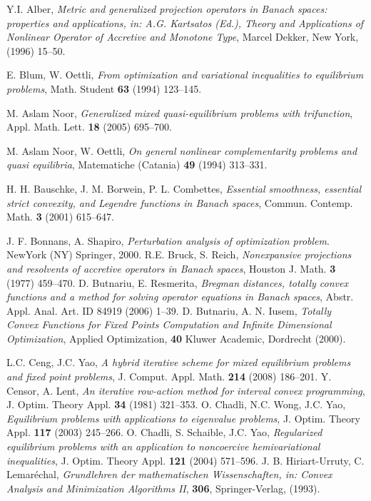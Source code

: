 \documentclass[reqno,b5paper]{amsart}
\theoremstyle{plain}
\theoremstyle{definition}
\numberwithin{equation}{section}
\numberwithin{equation}{section}
\begin{document}
\begin{thebibliography}{99}
Y.I. Alber, \textit{Metric and generalized projection operators in Banach spaces: properties and applications, in: A.G. Kartsatos (Ed.), Theory and Applications of Nonlinear Operator of Accretive and Monotone Type}, Marcel Dekker, New York, (1996) 15--50.

E. Blum, W. Oettli, \textit{From optimization and variational inequalities to equilibrium problems}, Math. Student \textbf{63} (1994) 123--145.

M. Aslam Noor, \textit{Generalized mixed quasi-equilibrium problems with trifunction}, Appl. Math. Lett. \textbf{18} (2005) 695--700.

M. Aslam Noor, W. Oettli, \textit{On general nonlinear complementarity problems and quasi equilibria}, Matematiche (Catania) \textbf{49} (1994) 313--331.

H. H. Bauschke, J. M. Borwein, P. L. Combettes, \textit{Essential smoothness, essential strict convexity, and
Legendre functions in Banach spaces}, Commun. Contemp. Math. \textbf{3} (2001) 615--647.

J. F. Bonnans, A. Shapiro, \textit{Perturbation analysis of optimization problem}. NewYork (NY) Springer, 2000.
R.E. Bruck, S. Reich, \textit{Nonexpansive projections and resolvents of accretive operators in Banach spaces}, Houston J. Math. \textbf{3} (1977)
459--470.
D. Butnariu, E. Resmerita, \textit{Bregman distances, totally convex functions and a method for solving operator equations in Banach spaces}, Abstr. Appl.
Anal. Art. ID 84919 (2006) 1--39. 
D. Butnariu, A. N. Iusem, \textit{ Totally Convex Functions for Fixed Points Computation and Infinite Dimensional
Optimization}, Applied Optimization, \textbf{40}  Kluwer Academic, Dordrecht (2000).

L.C. Ceng, J.C. Yao, \textit{A hybrid iterative scheme for mixed equilibrium problems and fixed point problems}, J. Comput. Appl. Math. \textbf{214} (2008) 186--201.
Y. Censor, A. Lent, \textit{An iterative row-action method for interval convex programming}, J. Optim. Theory Appl. \textbf{34} (1981) 321--353.
O. Chadli, N.C. Wong, J.C. Yao, \textit{Equilibrium problems with applications to eigenvalue problems}, J. Optim. Theory Appl. \textbf{117} (2003) 245--266.
O. Chadli, S. Schaible, J.C. Yao, \textit{Regularized equilibrium problems with an application to noncoercive hemivariational inequalities}, J. Optim. Theory
Appl. \textbf{121} (2004) 571--596.
J. B. Hiriart-Urruty, C. Lemar\'{e}chal, \textit{Grundlehren der mathematischen Wissenschaften, in: Convex Analysis and Minimization Algorithms II}, \textbf{ 306},
Springer-Verlag, (1993).


\end{thebibliography}
\end{document}
